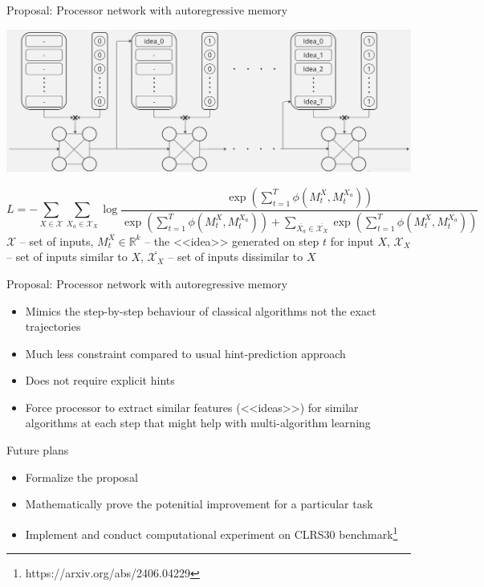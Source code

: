 \documentclass[10pt]{beamer}
\begin{document}
\begin{frame}{Proposal: Processor network with autoregressive memory}
	\begin{center}
		\includegraphics[scale=0.25]{../pictures/extra-ARM-GNN.png}
	\end{center}
	\begin{equation*}
		L = - \sum_{X\in \mathcal{X}}\sum\limits_{X_a \in \mathcal{X}_X}\log\frac{  \exp{\left(  \sum\limits_{t=1}^{T} \phi\left(M_t^X, M_t^{X_a}\right)  \right)}  }{  \exp{\left(  \sum_{t=1}^{T} \phi\left(M_t^X, M_t^{X_a}\right)  \right)} + \sum\limits_{\overline{X_a}\in \overline{\mathcal{X}_X}}\exp\left(\sum\limits_{t=1}^{T}\phi\left(M_t^X, M_t^{\overline{X_a}}\right)\right)  }
	\end{equation*}
		$\mathcal{X}$ -- set of inputs, $M_t^X\in \mathbb{R}^k$ -- the <<idea>> generated on step $t$ for input $X$, $\mathcal{X}_X$ -- set of inputs similar to $X$, $\overline{\mathcal{X}_X}$ -- set of inputs dissimilar to $X$
\end{frame}


\begin{frame}{Proposal: Processor network with autoregressive memory}
	\begin{itemize}
		\item Mimics the step-by-step behaviour of classical algorithms not the exact trajectories
		\item Much less constraint compared to usual hint-prediction approach
		\item Does not require explicit hints
		\item Force processor to extract similar features (<<ideas>>) for similar algorithms at each step that might help with multi-algorithm learning
	\end{itemize}
\end{frame}

\begin{frame}{Future plans}
	\begin{itemize}
		\item Formalize the proposal
		\item Mathematically prove the potenitial improvement for a particular task
		\item Implement and conduct computational experiment on CLRS30 benchmark\footnote{https://arxiv.org/abs/2406.04229} 
	\end{itemize}
\end{frame}
\end{document}
